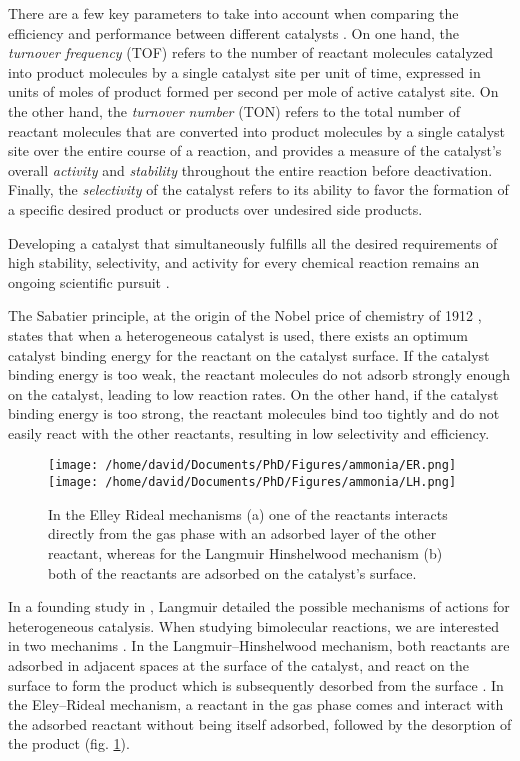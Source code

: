 There are a few key parameters to take into account when comparing the efficiency and performance between different catalysts \parencite{Boudart1995, ZHANG2019, WACHS2022}.
On one hand, the \textit{turnover frequency} (TOF) refers to the number of reactant molecules catalyzed into product molecules by a single catalyst site per unit of time, expressed in units of moles of product formed per second per mole of active catalyst site.
On the other hand, the \textit{turnover number} (TON) refers to the total number of reactant molecules that are converted into product molecules by a single catalyst site over the entire course of a reaction, and provides a measure of the catalyst's overall \textit{activity} and \textit{stability} throughout the entire reaction before deactivation.
Finally, the \textit{selectivity} of the catalyst refers to its ability to favor the formation of a specific desired product or products over undesired side products.

Developing a catalyst that simultaneously fulfills all the desired requirements of high stability, selectivity, and activity for every chemical reaction remains an ongoing scientific pursuit \parencite{Hagen2016}.

The Sabatier principle, at the origin of the Nobel price of chemistry of 1912 \parencite{Che2013}, states that when a heterogeneous catalyst is used, there exists an optimum catalyst binding energy for the reactant on the catalyst surface.
If the catalyst binding energy is too weak, the reactant molecules do not adsorb strongly enough on the catalyst, leading to low reaction rates.
On the other hand, if the catalyst binding energy is too strong, the reactant molecules bind too tightly and do not easily react with the other reactants, resulting in low selectivity and efficiency.

\begin{figure}[!htb]
    \centering
    \texttt{[image: /home/david/Documents/PhD/Figures/ammonia/ER.png]}
    \texttt{[image: /home/david/Documents/PhD/Figures/ammonia/LH.png]}
    \caption{
        In the Elley Rideal mechanisms (a) one of the reactants interacts directly from the gas phase with an adsorbed layer of the other reactant, whereas for the Langmuir Hinshelwood mechanism (b) both of the reactants are adsorbed on the catalyst's surface.
    }
    \label{fig:Mechanisms}
\end{figure}

In a founding study in \cite*{Langmuir1922}, Langmuir detailed the possible mechanisms of actions for heterogeneous catalysis.
When studying bimolecular reactions, we are interested in two mechanims \parencite{catal12101134}.
In the Langmuir–Hinshelwood mechanism, both reactants are adsorbed in adjacent spaces at the surface of the catalyst, and react on the surface to form the product which is subsequently desorbed from the surface \parencite{Prins2018, ROSS2019}.
In the Eley–Rideal mechanism, a reactant in the gas phase comes and interact with the adsorbed reactant without being itself adsorbed, followed by the desorption of the product \parencite{rideal_1939, Weinberg1996}  (fig. \ref{fig:Mechanisms}).

